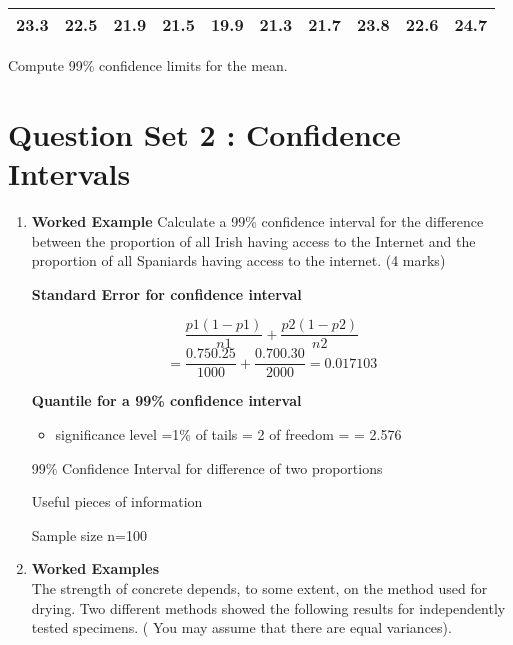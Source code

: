 \begin{center}
\begin{tabular}{|c|c|c|c|c|c|c|c|c|c|}
\hline
23.3 & 22.5 & 21.9 & 21.5 & 19.9 & 21.3 & 21.7 & 23.8 & 22.6 &
24.7\\
\hline
\end{tabular}
\end{center}

Compute 99\% confidence limits for the mean.


\newpage
\section*{Question Set 2 : Confidence Intervals}
\begin{enumerate}

\item \textbf{Worked Example}
Calculate a 99\% confidence interval for the difference between the proportion of all Irish having access to the
Internet and the proportion of all Spaniards having access to the internet.  (4 marks)



\noindent \textbf{Standard Error for confidence interval}

\[\frac{p1(1 -p1)}{n1}+ \frac{p2(1 -p2)}{n2}\]
\[=\frac{0.750.25}{1000}+ \frac{0.700.30}{2000}     =  0.017103\]

\noindent \textbf{Quantile for a 99\% confidence interval}
\begin{itemize}
\item significance level  =1\%
\itemnumber of tails = 2
\itemdegrees of freedom = 
\itemquantile = 2.576 
\end{itemize}



99\% Confidence Interval for difference of two proportions



Useful pieces of information


Sample size  n=100


\item \textbf{Worked Examples} \\

The strength of concrete depends, to some extent, on the method used for drying. Two different methods showed the following results for independently tested specimens.  ( You may assume that there are equal variances).



\end{enumerate}
